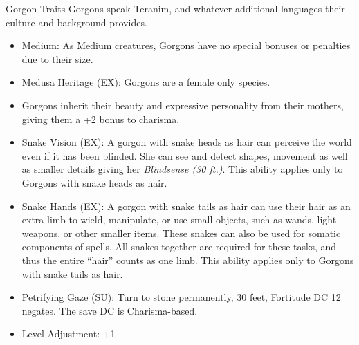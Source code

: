 
\begin{35e}{Gorgon Traits}
  Gorgons speak Teranim, and whatever additional languages their culture and
  background provides.

  \begin{itemize}[noitemsep]
    \item Medium: As Medium creatures, Gorgons have no special bonuses or
      penalties due to their size.
    \item Medusa Heritage (EX): Gorgons are a female only species.
    \item Gorgons inherit their beauty and expressive personality from their
      mothers, giving them a +2 bonus to charisma.
    \item Snake Vision (EX): A gorgon with snake heads as hair can perceive
      the world even if it has been blinded. She can see and detect shapes,
      movement as well as smaller details giving her \emph{Blindsense (30
        ft.)}. This ability applies only to Gorgons with snake heads as hair.
    \item Snake Hands (EX): A gorgon with snake tails as hair can use their
      hair as an extra limb to wield, manipulate, or use small objects, such
      as wands, light weapons, or other smaller items. These snakes can also
      be used for somatic components of spells. All snakes together are
      required for these tasks, and thus the entire ``hair'' counts as one
      limb. This ability applies only to Gorgons with snake tails as hair.
    \item Petrifying Gaze (SU): Turn to stone permanently, 30 feet, Fortitude
      DC 12 negates. The save DC is Charisma-based.
    \item Level Adjustment: +1
  \end{itemize}
\end{35e}

